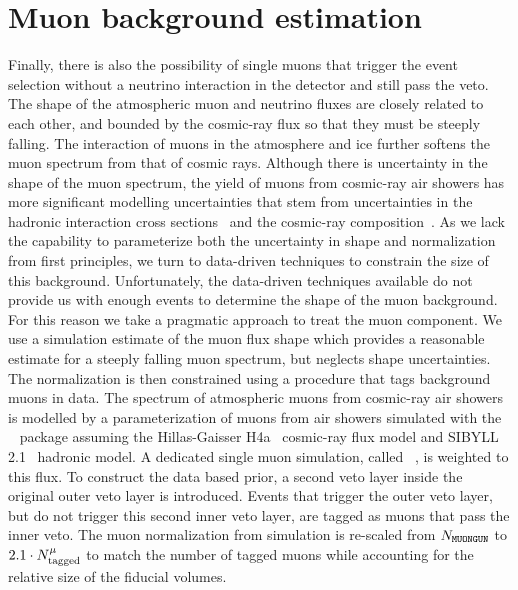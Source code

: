 \section{Muon background estimation}\label{sec:muon_background}
Finally, there is also the possibility of single muons that trigger the event selection without a neutrino interaction in the detector and still pass the veto.
The shape of the atmospheric muon and neutrino fluxes are closely related to each other, and bounded by the cosmic-ray flux so that they must be steeply falling.
The interaction of muons in the atmosphere and ice further softens the muon spectrum from that of cosmic rays.
Although there is uncertainty in the shape of the muon spectrum, the yield of muons from cosmic-ray air showers has more significant modelling uncertainties that stem from uncertainties in the hadronic interaction cross sections~\cite{Pierog:2017nes} and the cosmic-ray composition~\cite{Bluemer:2009zf}.
As we lack the capability to parameterize both the uncertainty in shape and normalization from first principles, we turn to data-driven techniques to constrain the size of this background.
Unfortunately, the data-driven techniques available do not provide us with enough events to determine the shape of the muon background.
For this reason we take a pragmatic approach to treat the muon component.
We use a simulation estimate of the muon flux shape which provides a reasonable estimate for a steeply falling muon spectrum, but neglects shape uncertainties.
The normalization is then constrained using a procedure that tags background muons in data.
The spectrum of atmospheric muons from cosmic-ray air showers is modelled by a parameterization of muons from air showers simulated with the \CORSIKA~\cite{Heck:1998vt} package assuming the Hillas-Gaisser H4a~\cite{Gaisser:2013bla} cosmic-ray flux model and SIBYLL 2.1~\cite{Ahn:2009wx} hadronic model.
A dedicated single muon simulation, called \MUONGUN~\cite{jvsthesis}, is weighted to this flux. 
To construct the data based prior, a second veto layer inside the original outer veto layer is introduced.
Events that trigger the outer veto layer, but do not trigger this second inner veto layer, are tagged as muons that pass the inner veto.
The muon normalization from simulation is re-scaled from $N_{\texttt{MUONGUN}}$ to $2.1\cdot N^\mu_\textmd{tagged}$ to match the number of tagged muons while accounting for the relative size of the fiducial volumes.
